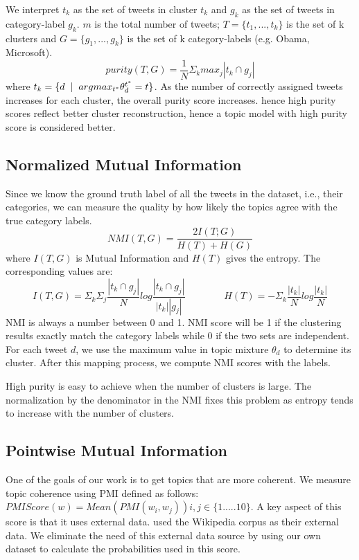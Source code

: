 \documentclass[10pt,a5paper,twoside]{article}
\begin{document}
We interpret $t_{k}$ as the set of tweets in cluster $t_{k}$ and
$g_{k}$ as the set of tweets in category-label $g_{k}$. $m$ is the
total number of tweets; $T = \lbrace t_{1}, ... , t_{k} \rbrace$ is
the set of k clusters and $ G = \lbrace g_{1}, ... , g_{k}\rbrace $ is
the set of k category-labels (e.g. Obama, Microsoft).
\[
 purity (T,G) = \frac{1}{N} \Sigma_{k} max_{j} |t_{k} \cap g_{j}|
\]
where $ t_k = \lbrace  d \hspace{2 mm} |  \hspace{2 mm} argmax_{t^*} \theta^{t^{*}}_d = t \rbrace $.
As the number of correctly assigned tweets increases for each cluster, the overall purity score increases. hence high purity scores reflect better cluster reconstruction, hence a topic model with high purity score is considered better.
\\

\subsection{Normalized Mutual Information}

Since we know the ground truth label of all the tweets in the dataset,
i.e., their categories, we can measure the quality by how likely the
topics agree with the true category labels.
\[
NMI(T,G) = \frac{2 I(T;G)}{H(T) + H(G)} 
\]
where $I(T,G)$ is Mutual Information and $H(T)$ gives the entropy. The 
corresponding values are:
\[
I(T,G) = \Sigma_{k} \Sigma_{j} \frac{|t_{k} \cap g_{j}|}{N} log \frac{|t_{k} \cap g_{j}|}{|t_{k}| |g_{j}|} 
~~~~~~~~~~~~~~~~~~
H(T) = - \Sigma_k \frac{|t_k|}{N} log \frac{|t_k|}{N} 
\]
NMI \cite{MRS08} is always a number between 0 and 1. NMI score will be
1 if the clustering results exactly match the category labels while 0
if the two sets are independent. For each tweet $d$, we use the
maximum value in topic mixture $ \theta_{d} $ to determine its
cluster. After this mapping process, we compute NMI scores with the
labels.

High purity is easy to achieve when the number of clusters is
large. The normalization by the denominator in the NMI fixes this
problem as entropy tends to increase with the number of clusters.

\subsection{Pointwise Mutual Information}

One of the goals of our work is to get topics that are more coherent. 
We measure topic coherence using PMI defined as follows:
$PMI Score(w) = Mean ( PMI(w_i,w_j) ) i,j \in \lbrace1.....10\rbrace $.
A key aspect of this score is that it uses external data.  \cite{baldwin10} used the Wikipedia corpus as their external data. We eliminate the need of this external data source by using our own dataset to calculate the probabilities used in this score.
\end{document}
